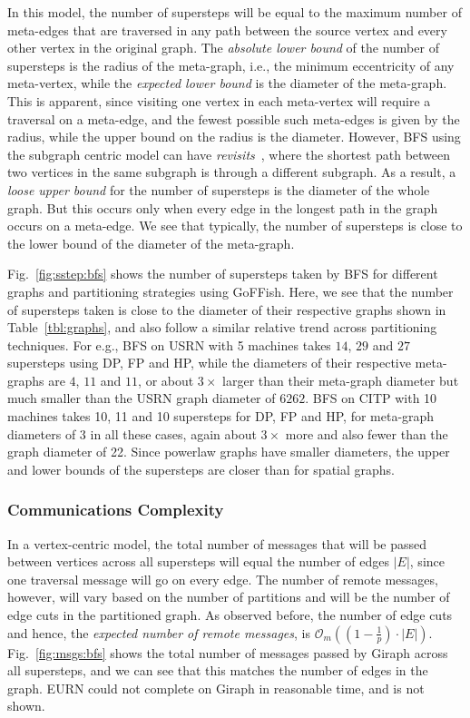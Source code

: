 \documentclass[10pt,conference, compsocconf]{IEEEtran}
\begin{document}
In this model, the number of supersteps will be equal to the maximum number of meta-edges that are traversed in any path between the source vertex and every other vertex in the original graph.
The \emph{absolute lower bound} of the number of supersteps is the radius of the meta-graph, i.e., the minimum eccentricity of any meta-vertex, while the \emph{expected lower bound} is the diameter of the meta-graph. This is apparent, since visiting one vertex in each meta-vertex will require a traversal on a meta-edge, and the fewest possible such meta-edges is given by the radius, while the upper bound on the radius is the diameter. However, BFS using the subgraph centric model can have \emph{revisits}~\cite{dindokar:parlearning:2015}, where the shortest path between two vertices in the same subgraph is through a different subgraph. As a result, a \emph{loose upper bound} for the number of supersteps is the diameter of the whole graph. But this occurs only when every edge in the longest path in the graph occurs on a meta-edge. We see that typically, the number of supersteps is close to the lower bound of the diameter of the meta-graph. 
 
Fig.~\ref{fig:sstep:bfs} shows the number of supersteps taken by BFS for  different graphs and partitioning strategies using GoFFish. Here, we see that the number of supersteps taken is close to the diameter of their respective graphs shown in Table~\ref{tbl:graphs}, and also follow a similar relative trend across partitioning techniques. For e.g., BFS on USRN with 5 machines takes $14$, $29$ and $27$ supersteps using DP, FP and HP, while the diameters of their respective meta-graphs are $4$, $11$ and $11$, or about $3\times$ larger than their meta-graph diameter but much smaller than the USRN graph diameter of $6262$. BFS on CITP with 10 machines takes 10, 11 and 10 supersteps for DP, FP and HP, for meta-graph diameters of $3$ in all these cases, again about $3\times$ more and also fewer than the graph diameter of 22. Since powerlaw graphs have smaller diameters, the upper and lower bounds of the supersteps are closer than for spatial graphs.










\subsubsection{Communications Complexity}
In a vertex-centric model, the total number of messages that will be passed between vertices across all supersteps will equal the number of edges $|E|$, since one traversal message will go on every edge. The number of remote messages, however, will vary based on the number of partitions and will be the number of edge cuts in the partitioned graph.  As observed before, the number of edge cuts and hence, the \emph{expected number of remote messages}, is $\mathcal{O}_m((1 - \frac{1}{p})\cdot |E|)$. Fig.~\ref{fig:msgs:bfs} shows the total number of messages passed by Giraph across all supersteps, and we can see that this matches the number of edges in the graph. EURN could not complete on Giraph in reasonable time, and is not shown.
\end{document}
